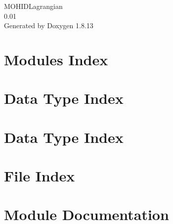 \documentclass[twoside]{book}
\newcommand{\+}{\discretionary{\mbox{\scriptsize$\hookleftarrow$}}{}{}}
\newcommand{\clearemptydoublepage}{%
  \newpage{\pagestyle{empty}\cleardoublepage}%
}
\begin{document}
\hypersetup{pageanchor=false,
             bookmarksnumbered=true,
             pdfencoding=unicode
            }
\begin{titlepage}
\vspace*{7cm}
\begin{center}%
{\Large M\+O\+H\+I\+D\+Lagrangian \\[1ex]\large 0.\+01 }\\
\vspace*{1cm}
{\large Generated by Doxygen 1.8.13}\\
\end{center}
\end{titlepage}
\clearemptydoublepage
{}
\tableofcontents
\clearemptydoublepage
{}
\hypersetup{pageanchor=true}

\chapter{Modules Index}

\chapter{Data Type Index}

\chapter{Data Type Index}

\chapter{File Index}

\chapter{Module Documentation}


















\end{document}
